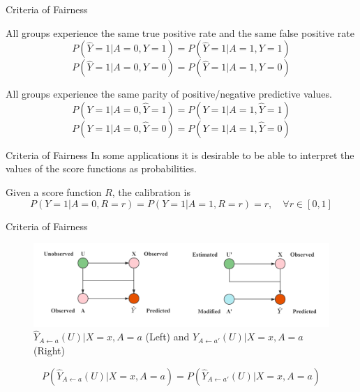 \documentclass[10pt, xcolor=table,aspectratio=169]{beamer}
\begin{document}
\begin{frame}{Criteria of Fairness}
	\begin{definition}[Separation]
		All groups experience the same true positive rate and the same false positive rate
		$$ P(\hat{Y}=1|A=0,Y=1)=P(\hat{Y}=1|A=1,Y=1)$$
		$$ P(\hat{Y}=1|A=0,Y=0)=P(\hat{Y}=1|A=1,Y=0)$$
	\end{definition}
	\begin{definition}[Sufficiency]
		All groups experience the same parity of positive/negative predictive values.
		$$ P(Y=1|A=0,\hat{Y}=1)=P(Y=1|A=1,\hat{Y}=1)$$
		$$ P(Y=1|A=0,\hat{Y}=0)=P(Y=1|A=1,\hat{Y}=0)$$
	\end{definition}

\end{frame}

\begin{frame}{Criteria of Fairness}
	In some applications it is desirable to be able to interpret the values of the score functions as probabilities.
	\begin{definition}[Calibration]
		Given a score function $R$, the calibration is
		$$ P(Y=1|A=0,R=r)=P(Y=1|A=1,R=r)=r, \quad \forall r\in [0,1]$$
	\end{definition}

\end{frame}

\begin{frame}{Criteria of Fairness}
	\begin{figure}[t]
		\begin{center}
			\includegraphics[width=0.8\columnwidth]{./figs/countf.png}
		\end{center}
		\caption{$\hat{Y}_{A\leftarrow a}(U)|X=x, A=a$ (Left) and $\hat{Y}_{A\leftarrow a'}(U)|X=x, A=a$ (Right)}
	\end{figure}
	\begin{definition}
		$$ P(\hat{Y}_{A\leftarrow a}(U)|X=x, A=a)=P(\hat{Y}_{A\leftarrow a'}(U)|X=x, A=a)$$
	\end{definition}

\end{frame}

\end{document}

